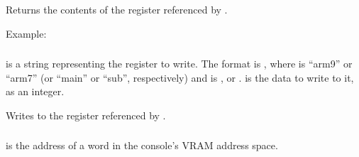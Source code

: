 \documentclass[letterpaper,10pt,english]{sphinxmanual}
\begin{document}
\sphinxAtStartPar
Returns the contents of the register referenced by .

\sphinxAtStartPar
Example:

\begin{sphinxVerbatim}[commandchars=\\\{\}]
 
       
        
           
            
\end{sphinxVerbatim}


\subsubsection{}
\label{\detokenize{mods:memory-setregister-cpu-dot-registername-string-value}}\label{\detokenize{mods:setregister}}
\sphinxAtStartPar
{} is a string representing the register to write. The format is , where  is “arm9” or “arm7” (or “main” or “sub”, respectively) and  is \sphinxhyphen{},  or .  is the data to write to it, as an integer.

\sphinxAtStartPar
Writes  to the register referenced by .


\subsubsection{}
\label{\detokenize{mods:memory-vram-readword-address}}\label{\detokenize{mods:vram-readword}}
\sphinxAtStartPar
{} is the address of a word in the console’s VRAM address space.
\end{document}
